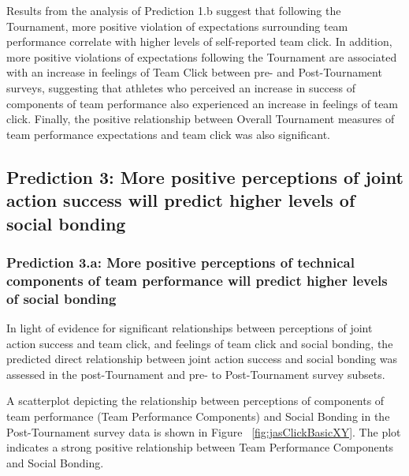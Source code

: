\begin{CJK}{UTF8}{gbsn}

   

   


   Results from the analysis of Prediction 1.b suggest that following the Tournament, more positive violation of expectations surrounding team performance correlate with higher levels of self-reported team click.  In addition, more positive violations of expectations following the Tournament are associated with an increase in feelings of Team Click between pre- and Post-Tournament surveys, suggesting that athletes who perceived an increase in success of components of team performance also experienced an increase in feelings of team click.  Finally, the positive relationship between Overall Tournament measures of team performance expectations and team click was also significant.






\subsection{Prediction 3: More positive perceptions of joint action success will predict higher levels of social bonding}



\subsubsection{Prediction 3.a: More positive perceptions of technical components of team performance will predict higher levels of social bonding }
In light of evidence for significant relationships between perceptions of joint action success and team click, and feelings of team click and social bonding, the predicted direct relationship between joint action success and social bonding was assessed in the post-Tournament and pre- to Post-Tournament survey subsets.

A scatterplot depicting the relationship between perceptions of components of team performance (Team Performance Components) and Social Bonding in the Post-Tournament survey data is shown in Figure ~\ref{fig:jasClickBasicXY}. The plot indicates a strong positive relationship between Team Performance Components and Social Bonding.


\end{CJK}

